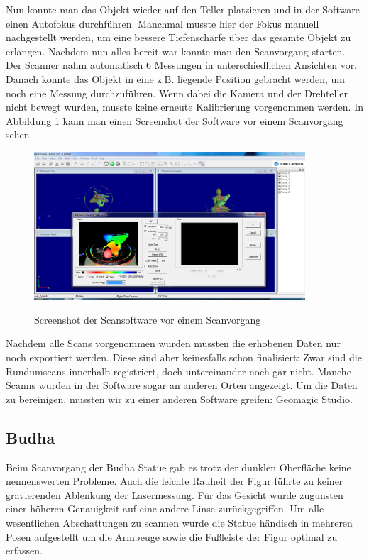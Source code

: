 \documentclass[]{article}
\begin{document}
Nun konnte man das Objekt wieder auf den Teller platzieren und in der Software einen Autofokus durchführen. Manchmal musste hier der Fokus manuell nachgestellt werden, um eine bessere Tiefenschärfe über das gesamte Objekt zu erlangen. Nachdem nun alles bereit war konnte man den Scanvorgang starten. Der Scanner nahm automatisch 6 Messungen in unterschiedlichen Ansichten vor. Danach konnte das Objekt in eine z.B. liegende Position gebracht werden, um noch eine Messung durchzuführen. Wenn dabei die Kamera und der Drehteller nicht bewegt wurden, musste keine erneute Kalibrierung vorgenommen werden. In Abbildung \ref{fig:scansoftware} kann man einen Screenshot der Software vor einem Scanvorgang sehen.

\begin{figure}[!h]
\caption{Screenshot der Scansoftware vor einem Scanvorgang}
\centering
\includegraphics[width=0.9\textwidth]{images/Statue_Liegend.PNG}
\label{fig:scansoftware}
\end{figure}

Nachdem alle Scans vorgenommen wurden mussten die erhobenen Daten nur noch exportiert werden. Diese sind aber keinesfalls schon finalisiert: Zwar sind die Rundumscans innerhalb registriert, doch untereinander noch gar nicht. Manche Scanns wurden in der Software sogar an anderen Orten angezeigt. Um die Daten zu bereinigen, mussten wir zu einer anderen Software greifen: Geomagic Studio.

\subsection{Budha}

Beim Scanvorgang der Budha Statue gab es trotz der dunklen Oberfläche keine nennenswerten Probleme. Auch die leichte Rauheit der Figur führte zu keiner gravierenden Ablenkung der Lasermessung. Für das Gesicht wurde zugunsten einer höheren Genauigkeit auf eine andere Linse zurückgegriffen. Um alle wesentlichen Abschattungen zu scannen wurde die Statue händisch in mehreren Posen aufgestellt um die Armbeuge sowie die Fußleiste der Figur optimal zu erfassen.
\end{document}
